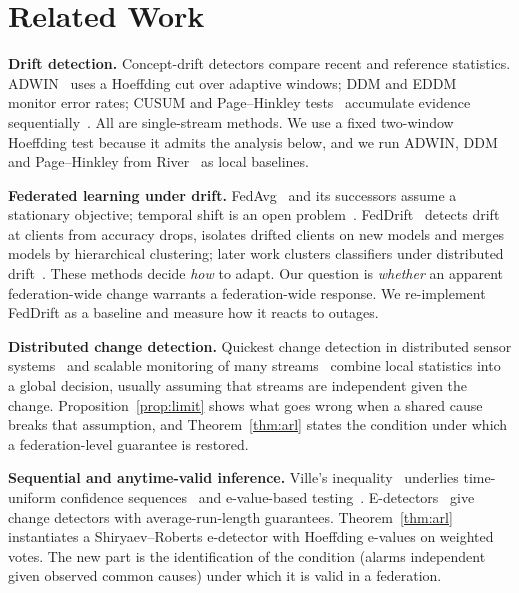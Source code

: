 \IfFileExists{IEEEtran.cls}{\documentclass[journal]{IEEEtran}\newcommand{\ieeemode}{}}{\documentclass[10pt,twocolumn,letterpaper]{article}\usepackage[margin=0.72in,columnsep=0.22in]{geometry}}
\begin{document}
\section{Related Work}\label{sec:related}
\noindent\textbf{Drift detection.} Concept-drift detectors compare recent and reference statistics. ADWIN~\cite{bifet2007adwin} uses a Hoeffding cut over adaptive windows; DDM and EDDM~\cite{gama2004ddm,baena2006eddm} monitor error rates; CUSUM and Page--Hinkley tests~\cite{page1954cusum} accumulate evidence sequentially~\cite{gama2014survey}. All are single-stream methods. We use a fixed two-window Hoeffding test because it admits the analysis below, and we run ADWIN, DDM and Page--Hinkley from River~\cite{montiel2021river} as local baselines.

\noindent\textbf{Federated learning under drift.} FedAvg~\cite{mcmahan2017fedavg} and its successors assume a stationary objective; temporal shift is an open problem~\cite{kairouz2021advances}. FedDrift~\cite{jothimurugesan2023feddrift} detects drift at clients from accuracy drops, isolates drifted clients on new models and merges models by hierarchical clustering; later work clusters classifiers under distributed drift~\cite{chen2024fedccfa}. These methods decide \emph{how} to adapt. Our question is \emph{whether} an apparent federation-wide change warrants a federation-wide response. We re-implement FedDrift as a baseline and measure how it reacts to outages.

\noindent\textbf{Distributed change detection.} Quickest change detection in distributed sensor systems~\cite{tartakovsky2008distributed} and scalable monitoring of many streams~\cite{mei2010scalable} combine local statistics into a global decision, usually assuming that streams are independent given the change. Proposition~\ref{prop:limit} shows what goes wrong when a shared cause breaks that assumption, and Theorem~\ref{thm:arl} states the condition under which a federation-level guarantee is restored.

\noindent\textbf{Sequential and anytime-valid inference.} Ville's inequality~\cite{ville1939} underlies time-uniform confidence sequences~\cite{howard2021timeuniform} and e-value-based testing~\cite{ramdas2023gametheoretic}. E-detectors~\cite{shin2024edetectors} give change detectors with average-run-length guarantees. Theorem~\ref{thm:arl} instantiates a Shiryaev--Roberts e-detector with Hoeffding e-values on weighted votes. The new part is the identification of the condition (alarms independent given observed common causes) under which it is valid in a federation.
\end{document}
